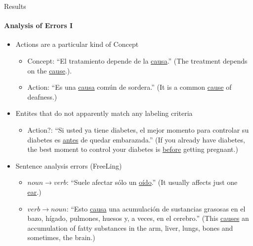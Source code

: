 \documentclass{beamer}
\begin{document}
\begin{frame}{Results}
\framesubtitle{Analysis of Errors I}
\begin{itemize}
  \item Actions are a particular kind of Concept
  
  \begin{itemize}
    \item \footnotesize Concept: ``El
tratamiento depende de la \underline{causa}.'' (The
treatment depends on the \underline{cause}.).
    \item Action: ``Es una \underline{causa} común
de sordera.'' (It is a common \underline{cause} of
deafness.)
  \end{itemize}

  \item Entites that do not apparently match any labeling criteria
  \begin{itemize}
    \item \footnotesize Action?: ``Si usted ya tiene diabetes, el mejor momento para controlar su diabetes es \underline{antes} de quedar embarazada.'' (If you already have diabetes, the best moment to control your diabetes is \underline{before} getting pregnant.)
  \end{itemize}
  \item Sentence analysis errors (FreeLing)
  \begin{itemize}
    \item \footnotesize $noun \rightarrow verb$: ``Suele afectar s\'{o}lo un \underline{o\'{i}do}.'' (It usually affects just one \underline{ear}.)
    \item $verb \rightarrow noun$: ``Esto \underline{causa} una acumulaci\'{o}n de sustancias grasosas en el bazo, h\'{i}gado, pulmones, huesos y, a veces, en el cerebro.'' (This \underline{causes} an accumulation of fatty substances in the arm, liver, lungs, bones and sometimes, the brain.)
  \end{itemize}
\end{itemize}
\end{frame}
\end{document}
